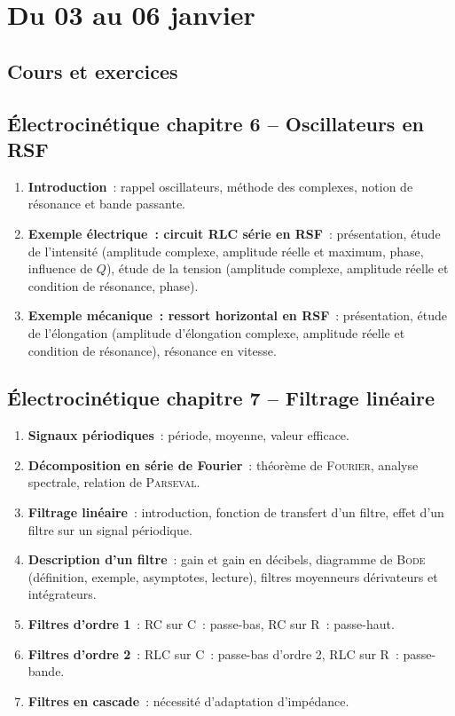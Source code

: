 \documentclass[a4paper, 12pt, final, garamond]{book}
\begin{document}
\setcounter{chapter}{12}

\chapter{Du 03 au 06 janvier}

\section{Cours et exercices}
\section*{Électrocinétique chapitre 6 -- Oscillateurs en RSF}
\begin{enumerate}[label=\Roman*]
    \item \textbf{Introduction}~: rappel oscillateurs, méthode des complexes,
        notion de résonance et bande passante.
    \item \textbf{Exemple électrique~: circuit RLC série en RSF}~: présentation,
        étude de l'intensité (amplitude complexe, amplitude réelle et maximum,
        phase, influence de $Q$), étude de la tension (amplitude complexe,
        amplitude réelle et condition de résonance, phase).
    \item \textbf{Exemple mécanique~: ressort horizontal en RSF}~: présentation,
        étude de l'élongation (amplitude d'élongation complexe, amplitude réelle
        et condition de résonance), résonance en vitesse.
\end{enumerate}

\section*{Électrocinétique chapitre 7 -- Filtrage linéaire}
\begin{enumerate}[label=\Roman*]
    \item \textbf{Signaux périodiques}~: période, moyenne, valeur efficace.
    \item \textbf{Décomposition en série de Fourier}~: théorème de
        \textsc{Fourier}, analyse spectrale, relation de \textsc{Parseval}.
    \item \textbf{Filtrage linéaire}~: introduction, fonction de transfert d'un
        filtre, effet d'un filtre sur un signal périodique.
    \item \textbf{Description d'un filtre}~: gain et gain en décibels, diagramme
        de \textsc{Bode} (définition, exemple, asymptotes, lecture), filtres
        moyenneurs dérivateurs et intégrateurs.
    \item \textbf{Filtres d'ordre 1}~: RC sur C~: passe-bas, RC sur R~:
        passe-haut.
    \item \textbf{Filtres d'ordre 2}~: RLC sur C~: passe-bas d'ordre 2, RLC sur R~:
        passe-bande.
    \item \textbf{Filtres en cascade}~: nécessité d'adaptation d'impédance.
\end{enumerate}
\end{document}
